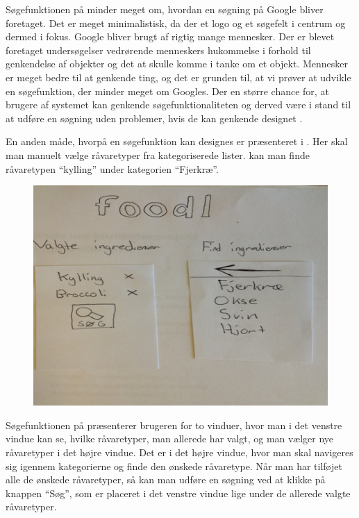 Søgefunktionen på  minder meget om, hvordan en søgning på \fx Google bliver foretaget. Det er meget minimalistisk, da der et logo og et søgefelt i centrum og dermed i fokus. Google bliver brugt af rigtig mange mennesker\cite{alexaGoogle}. Der er blevet foretaget undersøgelser vedrørende menneskers hukommelse i forhold til genkendelse af objekter og det at skulle komme i tanke om et objekt. Mennesker er meget bedre til at genkende ting, og det er grunden til, at vi prøver at udvikle en søgefunktion, der minder meget om Googles. Der en større chance for, at brugere af systemet kan genkende søgefunktionaliteten og derved være i stand til at udføre en søgning uden problemer, hvis de kan genkende designet \cite[p. ~340]{deb}.

En anden måde, hvorpå en søgefunktion kan designes er præsenteret i . Her skal man manuelt vælge råvaretyper fra kategoriserede lister. \Fx kan man finde råvaretypen ``kylling'' under kategorien ``Fjerkræ''.

\begin{figure}[H]
	\centering
	\includegraphics[scale=0.7]{billeder/prototyper/prototype1b.png}
	\label{fig:prototype1bdesign}
\end{figure}

Søgefunktionen på  præsenterer brugeren for to vinduer, hvor man i det venstre vindue kan se, hvilke råvaretyper, man allerede har valgt, og man vælger nye råvaretyper i det højre vindue. Det er i det højre vindue, hvor man skal navigeres sig igennem kategorierne og finde den ønskede råvaretype. Når man har tilføjet alle de ønskede råvaretyper, så kan man udføre en søgning ved at klikke på knappen ``Søg'', som er placeret i det venstre vindue lige under de allerede valgte råvaretyper.

